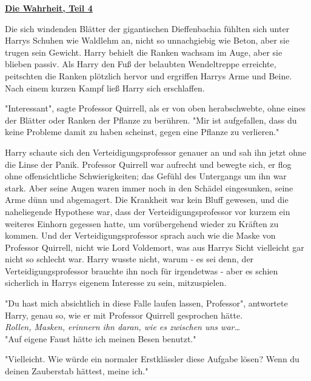 

\hypertarget{die-wahrheit-teil-4}{%

\textbf{\uline{Die Wahrheit, Teil 4}}

Die sich windenden Blätter der gigantischen Dieffenbachia fühlten sich unter Harrys Schuhen wie Waldlehm an, nicht so unnachgiebig wie Beton, aber sie trugen sein Gewicht. Harry behielt die Ranken wachsam im Auge, aber sie blieben passiv. Als Harry den Fuß der belaubten Wendeltreppe erreichte, peitschten die Ranken plötzlich hervor und ergriffen Harrys Arme und Beine. Nach einem kurzen Kampf ließ Harry sich erschlaffen.

"Interessant", sagte Professor Quirrell, als er von oben herabschwebte, ohne eines der Blätter oder Ranken der Pflanze zu berühren. "Mir ist aufgefallen, dass du keine Probleme damit zu haben scheinst, gegen eine Pflanze zu verlieren."

Harry schaute sich den Verteidigungsprofessor genauer an und sah ihn jetzt ohne die Linse der Panik. Professor Quirrell war aufrecht und bewegte sich, er flog ohne offensichtliche Schwierigkeiten; das Gefühl des Untergangs um ihn war stark. Aber seine Augen waren immer noch in den Schädel eingesunken, seine Arme dünn und abgemagert. Die Krankheit war kein Bluff gewesen, und die naheliegende Hypothese war, dass der Verteidigungsprofessor vor kurzem ein weiteres Einhorn gegessen hatte, um vorübergehend wieder zu Kräften zu kommen. Und der Verteidigungsprofessor sprach auch wie die Maske von Professor Quirrell, nicht wie Lord Voldemort, was aus Harrys Sicht vielleicht gar nicht so schlecht war. Harry wusste nicht, warum - es sei denn, der Verteidigungsprofessor brauchte ihn noch für irgendetwas - aber es schien sicherlich in Harrys eigenem Interesse zu sein, mitzuspielen.

"Du hast mich absichtlich in diese Falle laufen lassen, Professor", antwortete Harry, genau so, wie er mit Professor Quirrell gesprochen hätte.\\ \emph{Rollen, Masken, erinnern ihn daran, wie es zwischen uns war…}\\ "Auf eigene Faust hätte ich meinen Besen benutzt."

"Vielleicht. Wie würde ein normaler Erstklässler diese Aufgabe lösen? Wenn du deinen Zauberstab hättest, meine ich."

}
